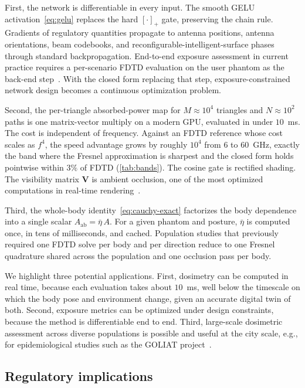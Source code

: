 \documentclass[journal,twocolumn,10pt]{IEEEtran}
\theoremstyle{plain}
\newcommand{\Aab}{A_{\mathrm{ab}}}
\begin{document}
First, the network is differentiable in every input. The smooth
\gls{GELU} activation~\eqref{eq:gelu} replaces the hard $[\cdot]_+$
gate, preserving the chain rule. Gradients of
regulatory quantities propagate to antenna positions, antenna
orientations, beam codebooks, and reconfigurable-intelligent-surface
phases through standard backpropagation.
End-to-end exposure assessment in current practice requires a
per-scenario FDTD evaluation on the user phantom as the back-end
step~\cite{Wydaeghe2022access,Wydaeghe2026npj}. With the closed form
replacing that step, exposure-constrained network design becomes a
continuous optimization problem.

Second, the per-triangle absorbed-power map for $M \approx 10^4$
triangles and $N \approx 10^2$ paths is one matrix-vector multiply on
a modern GPU, evaluated in under $10$~ms. The cost is independent of
frequency. Against an FDTD reference whose cost scales as $f^4$, the
speed advantage grows by roughly $10^4$ from $6$ to $60$~GHz, exactly
the band where the Fresnel approximation is sharpest and the closed
form holds pointwise within $3\%$ of FDTD (\cref{tab:bands}). The
cosine gate is rectified shading. The visibility matrix $\mathbf{V}$
is ambient occlusion, one of the most optimized computations in
real-time rendering~\cite{AkenineMoller2018}.

Third, the whole-body identity~\eqref{eq:cauchy-exact} factorizes the
body dependence into a single scalar $\Aab = \bar\eta\,A$. For a
given phantom and posture, $\bar\eta$ is computed once, in tens of
milliseconds, and cached. Population studies that previously
required one FDTD solve per body and per direction reduce to one
Fresnel quadrature shared across the population and one occlusion
pass per body.

We highlight three potential applications. First, dosimetry can be
computed in real time, because each evaluation takes about $10$~ms,
well below the timescale on which the body pose and environment
change, given an accurate digital twin of both. Second, exposure
metrics can be optimized under design constraints, because the method
is differentiable end to end. Third, large-scale dosimetric assessment
across diverse populations is possible and useful at the city scale,
e.g., for epidemiological studies such as the GOLIAT
project~\cite{Goliat}.

\subsection{Regulatory implications}\label{subsec:disc-regulatory}
\end{document}
